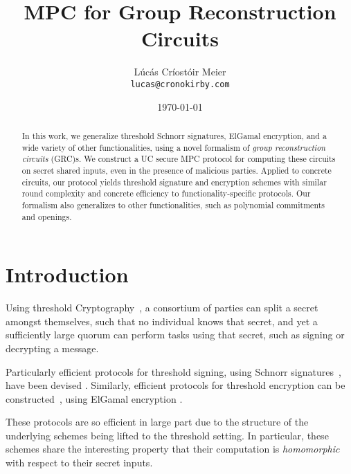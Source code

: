 

\date{\today}
\title{MPC for Group Reconstruction Circuits}
\author{Lúcás Críostóir Meier\\\texttt{lucas@cronokirby.com}}



\maketitle

\begin{abstract}
    \noindent In this work, we generalize threshold Schnorr signatures,
    {ElGamal encryption}, and a wide variety of other functionalities,
    using a novel formalism of \emph{group reconstruction circuits} (GRC)s.
    We construct a UC secure MPC protocol for computing these circuits
    on secret shared inputs, even in the presence of malicious parties.
    Applied to concrete circuits,
    our protocol yields threshold signature and encryption schemes
    with similar round complexity and concrete efficiency to
    functionality-specific protocols.
    Our formalism also generalizes to other functionalities,
    such as polynomial commitments and openings.
\end{abstract}

\section{Introduction}

Using threshold Cryptography~\cite{desmedt_society_1988,desmedt_threshold_1990},
a consortium of parties can split
a secret amongst themselves, such that no individual knows that
secret, and yet a sufficiently large quorum can
perform tasks using that secret, such as signing
or decrypting a message.

Particularly efficient protocols for threshold signing,
using Schnorr signatures~\cite{schnorr_efficient_1990},
have been devised
\cite{komlo_frost_2020, nick_musig2_2021, lindell_simple_2022}.
Similarly, efficient protocols for threshold
encryption can be constructed~\cite{desmedt_threshold_1990, shoup_securing_2001},
using ElGamal encryption \cite{elgamal_public_1985}.

These protocols are so efficient in large part due to the structure
of the underlying schemes being lifted to the threshold setting.
In particular, these schemes share the interesting property
that their computation is \emph{homomorphic} with respect
to their secret inputs.

